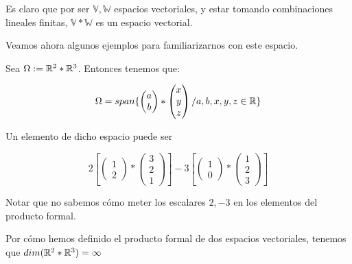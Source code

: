 Es claro que por ser $\mathbb{V}, \mathbb{W}$ espacios vectoriales, y estar tomando combinaciones lineales finitas, $\mathbb{V} \ast \mathbb{W}$ es un espacio vectorial.

Veamos ahora algunos ejemplos para familiarizarnos con este espacio.

\begin{ejemplo} \label{ej:prod_formal}

Sea $\Omega := \mathbb{R}^2 \ast \mathbb{R}^3$. Entonces tenemos que:

\begin{equation}
    \Omega = span \{ 
        \begin{pmatrix}
            a \\
            b
        \end{pmatrix}
        \ast
        \begin{pmatrix}
            x \\
            y \\
            z
        \end{pmatrix}
        / a, b, x, y, z \in \mathbb{R}
     \}
\end{equation}

Un elemento de dicho espacio puede ser

$$
2 \left[ \begin{pmatrix}1 \\ 2\end{pmatrix} \ast \begin{pmatrix}3 \\ 2 \\ 1 \end{pmatrix} \right]
- 3 \left[ \begin{pmatrix}1 \\ 0\end{pmatrix} \ast \begin{pmatrix}1 \\ 2 \\ 3 \end{pmatrix} \right]
$$

Notar que no sabemos cómo meter los escalares $2, -3$ en los elementos del producto formal.

Por cómo hemos definido el producto formal de dos espacios vectoriales, tenemos que $dim(\mathbb{R}^2 \ast \mathbb{R}^3) = \infty$

\end{ejemplo}

